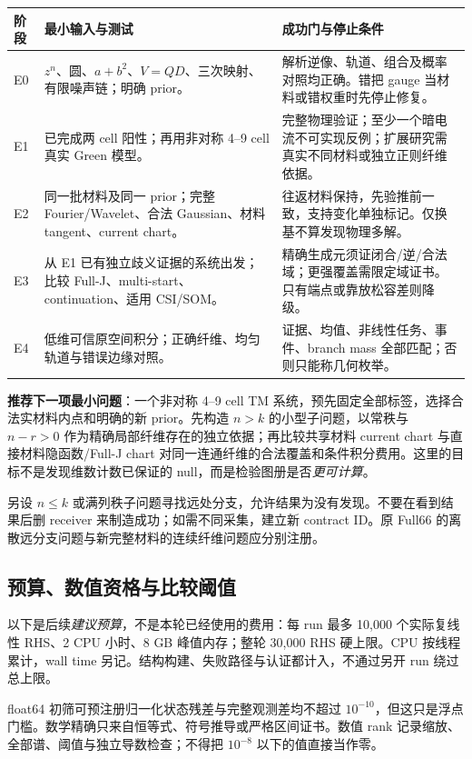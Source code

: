 \begin{longtable}{p{}p{}p{}}
\toprule 阶段 & 最小输入与测试 & 成功门与停止条件\\\midrule\endhead
E0 & $z^n$、圆、$a+b^2$、$V=QD$、三次映射、有限噪声链；明确 prior。 & 解析逆像、轨道、组合及概率对照均正确。错把 gauge 当材料或错权重时先停止修复。\\
E1 & 已完成两 cell 阳性；再用非对称 4--9 cell 真实 Green 模型。 & 完整物理验证；至少一个暗电流不可实现反例；扩展研究需真实不同材料或独立正则纤维依据。\\
E2 & 同一批材料及同一 prior；完整 Fourier/Wavelet、合法 Gaussian、材料 tangent、current chart。 & 往返材料保持，先验推前一致，支持变化单独标记。仅换基不算发现物理多解。\\
E3 & 从 E1 已有独立歧义证据的系统出发；比较 Full-J、multi-start、continuation、适用 CSI/SOM。 & 精确生成元须证闭合/逆/合法域；更强覆盖需限定域证书。只有端点或靠放松容差则降级。\\
E4 & 低维可信原空间积分；正确纤维、均匀轨道与错误边缘对照。 & 证据、均值、非线性任务、事件、branch mass 全部匹配；否则只能称几何枚举。\\\bottomrule
\end{longtable}

\textbf{推荐下一项最小问题}：一个非对称 4--9 cell TM 系统，预先固定全部标签，选择合法实材料内点和明确的新 prior。先构造 $n>k$ 的小型子问题，以常秩与 $n-r>0$ 作为精确局部纤维存在的独立依据；再比较共享材料 current chart 与直接材料隐函数/Full-J chart 对同一连通纤维的合法覆盖和条件积分费用。这里的目标不是发现维数计数已保证的 null，而是检验图册是否\emph{更可计算}。

另设 $n\le k$ 或满列秩子问题寻找远处分支，允许结果为没有发现。不要在看到结果后删 receiver 来制造成功；如需不同采集，建立新 contract ID。原 Full66 的离散远分支问题与新完整材料的连续纤维问题应分别注册。

\subsection{预算、数值资格与比较阈值}

以下是后续\emph{建议预算}，不是本轮已经使用的费用：每 run 最多 10,000 个实际复线性 RHS、2 CPU 小时、8 GB 峰值内存；整轮 30,000 RHS 硬上限。CPU 按线程累计，wall time 另记。结构构建、失败路径与认证都计入，不通过另开 run 绕过总上限。

float64 初筛可预注册归一化状态残差与完整观测差均不超过 $10^{-10}$，但这只是浮点门槛。数学精确只来自恒等式、符号推导或严格区间证书。数值 rank 记录缩放、全部谱、阈值与独立导数检查；不得把 $10^{-8}$ 以下的值直接当作零。

